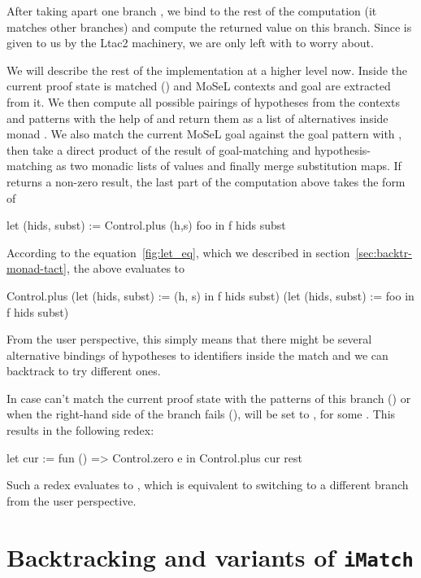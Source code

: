 After taking apart one branch , we bind  to the rest of the computation (it matches other branches) and compute the returned value on this branch.
Since  is given to us by the Ltac2 machinery, we are only left with  to worry about.

We will describe the rest of the implementation at a higher level now.
Inside  the current proof state is matched () and MoSeL contexts and goal are extracted from it.
We then compute all possible pairings of hypotheses from the contexts and patterns with the help of  and return them as a list of alternatives inside monad .
We also match the current MoSeL goal against the goal pattern  with , then take a direct product of the result of goal-matching and hypothesis-matching as two monadic lists of values and finally merge substitution maps.
If  returns a non-zero result, the last part of the computation above takes the form of
\begin{coq}
let (hids, subst) := Control.plus (h,s) foo in
f hids subst
\end{coq}

According to the equation~\ref{fig:let_eq}, which we described in section~\ref{sec:backtr-monad-tact}, the above evaluates to
\begin{coq}
Control.plus
  (let (hids, subst) := (h, s) in
   f hids subst)
  (let (hids, subst) := foo in
   f hids subst)
\end{coq}

From the user perspective, this simply means that there might be several alternative bindings of hypotheses to identifiers inside the match and we can backtrack to try different ones.

In case  can't match the current proof state with the patterns of this branch () or when the right-hand side of the branch fails (),  will be set to , for some .
This results in the following redex:
\begin{coq}
let cur := fun () => Control.zero e
in Control.plus cur rest
\end{coq}
Such a redex evaluates to , which is equivalent to switching to a different branch from the user perspective.

\section{Backtracking and variants of \texttt{iMatch}}

